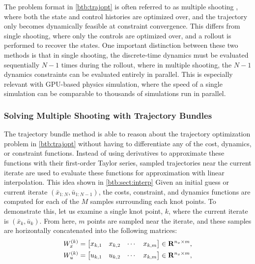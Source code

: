 The problem format in \eqref{btb:trajopt} is often referred to as multiple shooting \cite{hargraves1987, betts2001}, where both the state and control histories are optimized over, and the trajectory only becomes dynamically feasible at constraint convergence. This differs from single shooting, where only the controls are optimized over, and a rollout is performed to recover the states. One important distinction between these two methods is that in single shooting, the discrete-time dynamics must be evaluated sequentially $N-1$ times during the rollout, where in multiple shooting, the $N-1$ dynamics constraints can be evaluated entirely in parallel. This is especially relevant with GPU-based physics simulation, where the speed of a single simulation can be comparable to thousands of simulations run in parallel. 

\subsubsection{Solving Multiple Shooting with Trajectory Bundles}
The trajectory bundle method is able to reason about the trajectory optimization problem in \eqref{btb:trajopt} without having to differentiate any of the cost, dynamics, or constraint functions. Instead of using derivatives to approximate these functions with their first-order Taylor series, sampled trajectories near the current iterate are used to evaluate these functions for approximation with linear interpolation. This idea shown in \ref{btb:sect:interp}
Given an initial guess or current iterate $(\bar{x}_{1:N}, \bar{u}_{1:N-1})$, the costs, constraint, and dynamics functions are computed for each of the $M$ samples surrounding each knot points. To demonstrate this, let us examine a single knot point, $k$, where the current iterate is $(\bar{x}_k, \bar{u}_k)$. From here, $m$ points are sampled near the iterate, and these samples are horizontally concatenated into the following matrices:
\begin{align}
    W_x^{(k)} &= \begin{bmatrix}
        x_{k,1} & x_{k,2} & \cdots & x_{k,m}
    \end{bmatrix} \in \mathbf{R}^{n_x \times m}, \label{btb:Wx}\\
    W_u^{(k)} &= \begin{bmatrix}
        u_{k,1} & u_{k,2} & \cdots & x_{k,m}
    \end{bmatrix} \in \mathbf{R}^{n_x \times m}, \label{btb:Wu}
\end{align}
